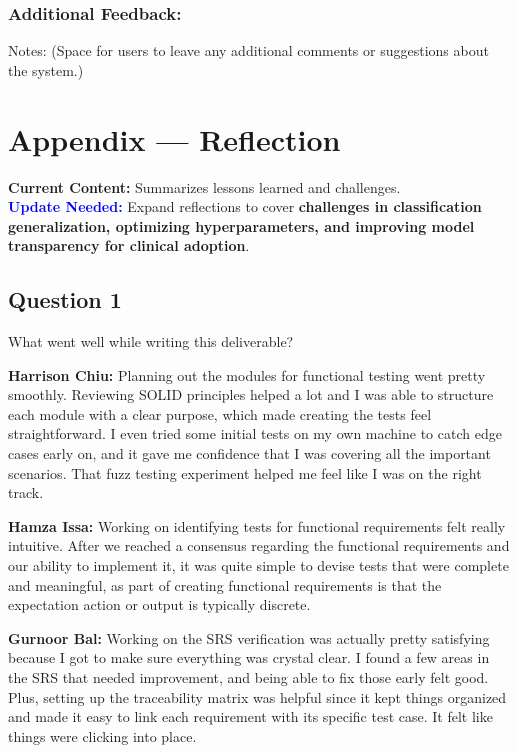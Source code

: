 \documentclass[12pt, titlepage]{article}
\begin{document}
\subsubsection{Additional Feedback:}
Notes: (Space for users to leave any additional comments or suggestions about the system.)

\newpage{}
\section*{Appendix --- Reflection}

\textbf{Current Content:} Summarizes lessons learned and challenges. \\
\textbf{\textcolor{blue}{Update Needed:}} Expand reflections to cover \textbf{challenges in classification generalization, optimizing hyperparameters, and improving model transparency for clinical adoption}.


\subsection{Question 1}
What went well while writing this deliverable?

\textbf{Harrison Chiu:}  Planning out the modules for functional testing went pretty smoothly. Reviewing SOLID principles helped a lot and I was able to structure each module with a clear purpose, which made creating the tests feel straightforward. I even tried some initial tests on my own machine to catch edge cases early on, and it gave me confidence that I was covering all the important scenarios. That fuzz testing experiment helped me feel like I was on the right track.

\textbf{Hamza Issa:} Working on identifying tests for functional requirements felt really intuitive. After we reached a consensus regarding the functional requirements and our ability to implement it, it was quite simple to devise tests that were complete and meaningful, as part of creating functional requirements is that the expectation action or output is typically discrete.

\textbf{Gurnoor Bal:} Working on the SRS verification was actually pretty satisfying because I got to make sure everything was crystal clear. I found a few areas in the SRS that needed improvement, and being able to fix those early felt good. Plus, setting up the traceability matrix was helpful since it kept things organized and made it easy to link each requirement with its specific test case. It felt like things were clicking into place.
\end{document}
